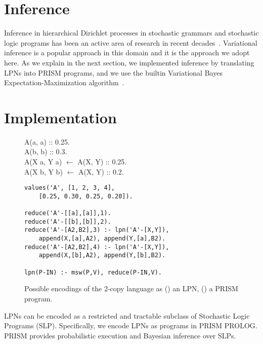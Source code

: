 \documentclass[11pt, twocolumn]{article}
\begin{document}
\section{Inference}
Inference in hierarchical Dirichlet processes in stochastic grammars
and stochastic logic programs has been an active area of research in
recent
decades~\cite{DBLP:conf/emnlp/LiangPJK07,goldwater2006contextual,johnson2006adaptor,cussens2001parameter}.
Variational inference is a popular approach in this domain and it is
the approach we adopt here. As we explain in the next section, we
implemented inference by translating LPNs into PRISM programs, and we
use the builtin Variational Bayes Expectation-Maximization
algorithm~\cite{sato2008variational}.


\section{Implementation}


\begin{figure}[t]
	\centering
	\begin{minipage}[b]{\linewidth}
A(a, a) :: 0.25. \\
A(b, b) :: 0.3. \\
A(X a, Y a) $\leftarrow$ A(X, Y) :: 0.25. \\
A(X b, Y b) $\leftarrow$ A(X, Y) :: 0.2.
		\subcaption{}
		\label{fig:grammar}
	\end{minipage}
	\begin{minipage}[b]{\linewidth}
		\begin{lstlisting}
values('A', [1, 2, 3, 4],
    [0.25, 0.30, 0.25, 0.20]).

reduce('A'-[[a],[a]],1).
reduce('A'-[[b],[b]],2).
reduce('A'-[A2,B2],3) :- lpn('A'-[X,Y]),
    append(X,[a],A2), append(Y,[a],B2).
reduce('A'-[A2,B2],4) :- lpn('A'-[X,Y]),
    append(X,[b],A2), append(Y,[b],B2).

lpn(P-IN) :- msw(P,V), reduce(P-IN,V).
		\end{lstlisting}
		\subcaption{}
		\label{fig:prism}
	\end{minipage}
	\caption{Possible encodings of the 2-copy language as () an LPN, () a PRISM program.}
	\label{fig:copy}
\end{figure}

LPNs can be encoded as a restricted and tractable subclass of Stochastic Logic Programs (SLP). Specifically, we encode LPNs as programs in PRISM PROLOG. PRISM provides probabilistic execution and Bayesian inference over SLPs.
\end{document}
